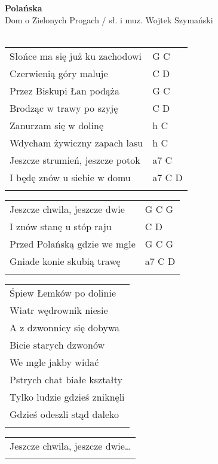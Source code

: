 \documentclass[a5paper]{article}
\begin{document}


\noindent
\fontsize{12pt}{15pt}\selectfont
\textbf{Polańska} \\
\fontsize{8pt}{10pt}\selectfont
Dom o Zielonych Progach / sł. i muz. Wojtek Szymański \\ \\
\fontsize{10pt}{12pt}\selectfont
{}
\begin{tabular}{@{}p{7.50cm}p{3cm}@{}}
\noindent
Słońce ma się już ku zachodowi & G C \\
Czerwienią góry maluje & C D \\
Przez Biskupi Łan podąża & G C \\
Brodząc w trawy po szyję & C D \\
Zanurzam się w dolinę & h C \\
Wdycham żywiczny zapach lasu & h C \\
Jeszcze strumień, jeszcze potok & a7 C \\
I będę znów u siebie w domu & a7 C D \\ \\
\end{tabular}

\noindent
\begin{tabular}{@{}p{6.50cm}p{3cm}@{}}
Jeszcze chwila, jeszcze dwie & G C G \\
I znów stanę u stóp raju & C D \\
Przed Polańską gdzie we mgle & G C G \\
Gniade konie skubią trawę & a7 C D \\ \\
\end{tabular}

\noindent
\begin{tabular}{@{}p{7.50cm}@{}}
Śpiew Łemków po dolinie \\
Wiatr wędrownik niesie \\
A z dzwonnicy się dobywa \\
Bicie starych dzwonów \\
We mgle jakby widać \\
Pstrych chat białe kształty \\
Tylko ludzie gdzieś zniknęli \\
Gdzieś odeszli stąd daleko \\ \\
\end{tabular}

\noindent
\begin{tabular}{@{}p{6.50cm}@{}}
Jeszcze chwila, jeszcze dwie… \\ \\
\end{tabular}
\end{document}
